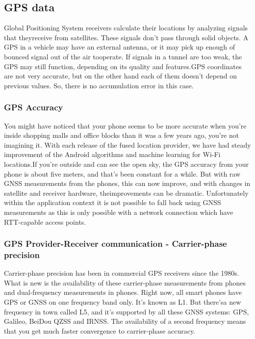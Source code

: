 \subsection{GPS data}
Global Positioning System receivers calculate their locations by analyzing signals that theyreceive from satellites. These signals don’t pass through solid objects. A GPS in a vehicle may have an external antenna, or it may pick up enough of bounced signal out of the air tooperate. If signals in a tunnel are too weak, the GPS may still function, depending on its quality and features.GPS coordinates are not very accurate, but on the other hand each of them doesn't depend on previous values. So, there is no accumulation error in this case. \cite{1-github-mad}
 
\subsubsection{GPS Accuracy}
You might have noticed that your phone seems to be more accurate when you’re inside shopping malls and office blocks than it was a few years ago, you’re not imagining it. With each release of the fused location provider, we have had steady improvement of the Android algorithms and machine learning for Wi-Fi locations.If you’re outside and can see the open sky, the GPS accuracy from your phone is about five meters, and that’s been constant for a while. But with raw GNSS measurements from the phones, this can now improve, and with changes in satellite and receiver hardware, theimprovements can be dramatic. Unfortunately within the application context it is not possible to fall back using GNSS measurements as this is only possible with a network connection which have RTT-capable access points. \cite{2-website}

\subsubsection{GPS Provider-Receiver communication - Carrier-phase precision}
Carrier-phase precision has been in commercial GPS receivers since the 1980s. What is new is the availability of these carrier-phase measurements from phones and dual-frequency measurements in phones. Right now, all smart phones have GPS or GNSS on one frequency band only. It’s known as L1. But there’sa new frequency in town called L5, and it’s supported by all these GNSS systems: GPS, Galileo, BeiDou QZSS and IRNSS. The availability of a second frequency means that you get much faster convergence to carrier-phase accuracy. \cite{2-website}

